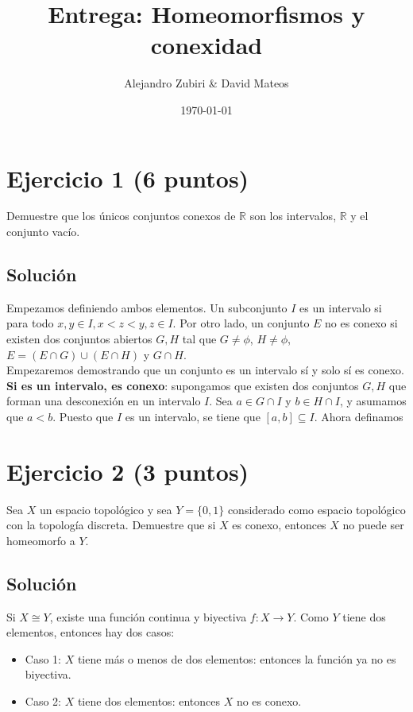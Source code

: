 \documentclass{amsbook}
\author{Alejandro Zubiri \& David Mateos}
\date{\today}
\title{Entrega: Homeomorfismos y conexidad}
\begin{document}
\maketitle
\section{Ejercicio 1 (6 puntos)}
Demuestre que los únicos conjuntos conexos de \(\mathbb{R}\) son los intervalos, \(\mathbb{R}\) y el
conjunto vacío.\\
\subsection{Solución}
Empezamos definiendo ambos elementos. Un subconjunto $I$ es un intervalo
si para todo $x,y\in I, x < z < y, z \in I$. Por otro lado, un conjunto $E$
no es conexo si existen dos conjuntos abiertos $G,H$ tal que $G \neq \phi$,
$H \neq \phi$, $E = (E \cap G) \cup (E \cap H)$ y $G \cap H $.\\
Empezaremos demostrando que un conjunto es un intervalo sí y solo sí 
es conexo.
\textbf{Si es un intervalo, es conexo}: supongamos que existen dos conjuntos
$G,H$ que forman una desconexión en un intervalo $I$. Sea $a \in G \cap I$ y $b \in H \cap I$,
y asumamos que $a < b$. Puesto que $I$ es un intervalo, se tiene que $[a,b] \subseteq I$.
Ahora definamos
\section{Ejercicio 2 (3 puntos)}
Sea \(X\) un espacio topológico y sea \(Y = \{ 0,1 \}\) considerado como espacio
topológico con la topología discreta. Demuestre que si \(X\) es conexo, entonces
\(X\) no puede ser homeomorfo a \(Y\).\\
\subsection{Solución}
Si $X \cong Y$, existe una función continua y biyectiva $f: X \to Y$. Como
$Y$ tiene dos elementos, entonces hay dos casos:
\begin{itemize}
	\item Caso 1: $X$ tiene más o menos de dos elementos: entonces la función
		ya no es biyectiva.
	\item Caso 2: $X$ tiene dos elementos: entonces $X$ no es conexo.  
\end{itemize}
\end{document}
